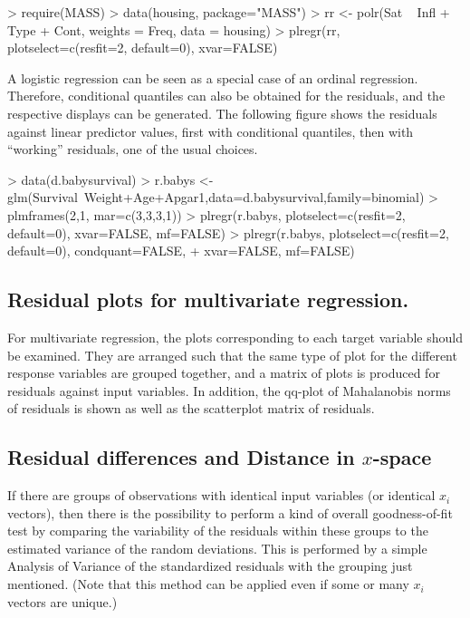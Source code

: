 \documentclass[11pt]{article}
\begin{document}
\begin{Schunk}
\begin{Sinput}
> require(MASS)
> data(housing, package="MASS")
> rr <- polr(Sat ~ Infl + Type + Cont, weights = Freq, data = housing)
> plregr(rr, plotselect=c(resfit=2, default=0), xvar=FALSE)
\end{Sinput}
\end{Schunk}

A logistic regression can be seen as a special case of an ordinal regression.
Therefore, conditional quantiles can also be obtained for the residuals,
and the respective displays can be generated.
The following figure shows the residuals against linear predictor values,
first with conditional quantiles, then with ``working'' residuals,
one of the usual choices.

\begin{Schunk}
\begin{Sinput}
>   data(d.babysurvival)
>   r.babys <- glm(Survival~Weight+Age+Apgar1,data=d.babysurvival,family=binomial)
>   plmframes(2,1, mar=c(3,3,3,1))
>   plregr(r.babys, plotselect=c(resfit=2, default=0), xvar=FALSE, mf=FALSE)
>   plregr(r.babys, plotselect=c(resfit=2, default=0), condquant=FALSE, 
+             xvar=FALSE, mf=FALSE)
\end{Sinput}
\end{Schunk}


\subsection{Residual plots for multivariate regression.}
For multivariate regression, the plots corresponding to each target
variable should be examined. 
They are arranged such that the same type of plot for the different
response variables are grouped together, and a matrix of plots is produced
for residuals against input variables.
In addition, the qq-plot of Mahalanobis norms of residuals is shown as well
as the scatterplot matrix of residuals.


\subsection{Residual differences and Distance in $x$-space}
If there are groups of observations with identical input variables
(or identical $x_i$ vectors), then there is the possibility to perform a kind
of overall goodness-of-fit test by comparing the variability of the
residuals within these groups to the estimated variance of the 
random deviations.
This is performed by a simple Analysis of Variance of the standardized 
residuals with the grouping just mentioned. 
(Note that this method can be applied even if some or many $x_i$ vectors 
are unique.)
\end{document}
